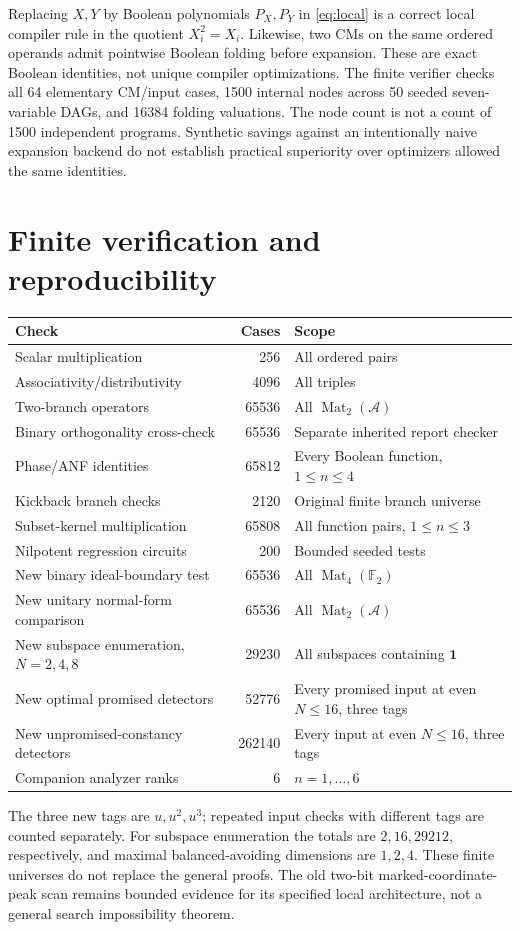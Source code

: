 \documentclass[11pt,a4paper]{article}
\theoremstyle{definition}\newtheorem{definition}[theorem]{Definition}
\theoremstyle{remark}\newtheorem{remark}[theorem]{Remark}
\newcommand{\F}{\mathbb F}
\newcommand{\A}{\mathcal A}
\newcommand{\Mat}{\operatorname{Mat}}
\numberwithin{equation}{section}
\begin{document}
Replacing $X,Y$ by Boolean polynomials $P_X,P_Y$ in \eqref{eq:local} is a correct local compiler rule in the quotient $X_i^2=X_i$. Likewise, two CMs on the same ordered operands admit pointwise Boolean folding before expansion. These are exact Boolean identities, not unique compiler optimizations. The finite verifier checks all 64 elementary CM/input cases, 1500 internal nodes across 50 seeded seven-variable DAGs, and 16384 folding valuations. The node count is not a count of 1500 independent programs. Synthetic savings against an intentionally naive expansion backend do not establish practical superiority over optimizers allowed the same identities.

\section{Finite verification and reproducibility}\label{app:checks}
\begin{longtable}{@{}L{.48\linewidth}rL{.29\linewidth}@{}}\toprule
Check & Cases & Scope\\\midrule\endhead
Scalar multiplication & 256 & All ordered pairs\\
Associativity/distributivity & 4096 & All triples\\
Two-branch operators & 65536 & All $\Mat_2(\A)$\\
Binary orthogonality cross-check & 65536 & Separate inherited report checker\\
Phase/ANF identities & 65812 & Every Boolean function, $1\le n\le4$\\
Kickback branch checks & 2120 & Original finite branch universe\\
Subset-kernel multiplication & 65808 & All function pairs, $1\le n\le3$\\
Nilpotent regression circuits & 200 & Bounded seeded tests\\
New binary ideal-boundary test & 65536 & All $\Mat_4(\F_2)$\\
New unitary normal-form comparison & 65536 & All $\Mat_2(\A)$\\
New subspace enumeration, $N=2,4,8$ & 29230 & All subspaces containing $\mathbf1$\\
New optimal promised detectors & 52776 & Every promised input at even $N\le16$, three tags\\
New unpromised-constancy detectors & 262140 & Every input at even $N\le16$, three tags\\
Companion analyzer ranks & 6 & $n=1,\ldots,6$\\\bottomrule
\end{longtable}
The three new tags are $u,u^2,u^3$; repeated input checks with different tags are counted separately. For subspace enumeration the totals are $2,16,29212$, respectively, and maximal balanced-avoiding dimensions are $1,2,4$. These finite universes do not replace the general proofs. The old two-bit marked-coordinate-peak scan remains bounded evidence for its specified local architecture, not a general search impossibility theorem.
\end{document}

